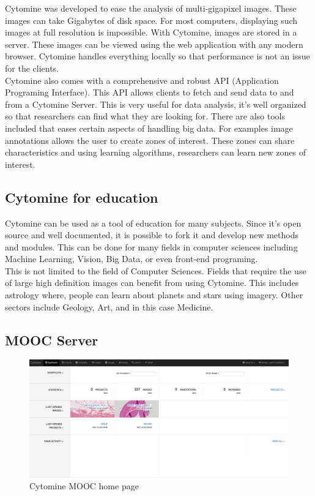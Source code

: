 \documentclass[a4paper,11pt]{report}
\numberwithin{figure}{section} %
\begin{document}
Cytomine was developed to ease the analysis of multi-gigapixel images.
These images can take Gigabytes of disk space.
For most computers, displaying such images at full resolution is impossible.
With Cytomine, images are stored in a server.
These images can be viewed using the web application with any modern browser.
Cytomine handles everything locally so that performance is not an issue for the clients.\\

	Cytomine also comes with a comprehensive and robust API (Application Programing Interface).
	This API allows clients to fetch and send data to and from a Cytomine Server.
	This is very useful for data analysis, it's well organized so that researchers can find what they are looking for.
	There are also tools included that eases certain aspects of handling big data.
	For examples image annotations allows the user to create zones of interest.
	These zones can share characteristics and using learning algorithms, researchers can learn new zones of interest.

\subsection{Cytomine for education}

Cytomine can be used as a tool of education for many subjects.
Since it's open source and well documented, it is possible to fork it and develop new methods and modules.
This can be done for many fields in computer sciences including Machine Learning, Vision, Big Data, or even front-end programing.\\

This is not limited to the field of Computer Sciences.
Fields that require the use of large high definition images can benefit from using Cytomine.
This includes astrology where, people can learn about planets and stars using imagery.
Other sectors include Geology, Art, and in this case Medicine.


\subsection{MOOC Server}

      \begin{figure}[H]
      \centering
      \includegraphics[width=.95\linewidth]{images/cytomine_home.png}
      \caption{Cytomine MOOC home page}
      \end{figure}
\end{document}
